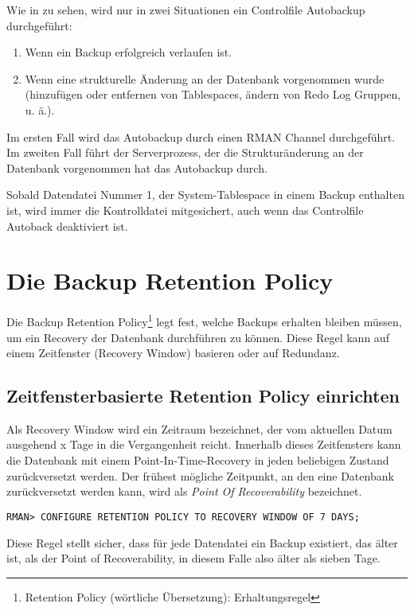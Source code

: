       Wie in  zu sehen, wird nur in zwei Situationen ein Controlfile Autobackup durchgef\"uhrt:
      \begin{enumerate}
        \item Wenn ein Backup erfolgreich verlaufen ist.
        \item Wenn eine strukturelle \"Anderung an der Datenbank vorgenommen wurde (hinzuf\"ugen oder entfernen von Tablespaces, \"andern von Redo Log Gruppen, u. \"a.).
      \end{enumerate}
      Im ersten Fall wird das Autobackup durch einen RMAN Channel durchgef\"uhrt. Im zweiten Fall f\"uhrt der Serverprozess, der die Struktur\"anderung an der Datenbank vorgenommen hat das Autobackup durch.
      \begin{merke}
        Sobald Datendatei Nummer 1, der System-Tablespace in einem Backup enthalten ist, wird immer die Kontrolldatei mitgesichert, auch wenn das Controlfile Autoback deaktiviert ist.
      \end{merke}

      \begin{literaturinternet}
        \item \cite[Control File and Server Parameter File Autobackups]{cfandspfileautobackups}
      \end{literaturinternet}
    \section{Die Backup Retention Policy}
      \label{backupretentionpolicy}
      Die Backup Retention Policy\footnote{Retention Policy (w\"ortliche \"Ubersetzung): Erhaltungsregel} legt fest, welche Backups erhalten bleiben m\"ussen, um ein Recovery der Datenbank durchf\"uhren zu k\"onnen. Diese Regel kann auf einem Zeitfenster (Recovery Window) basieren oder auf Redundanz.
      \subsection{Zeitfensterbasierte Retention Policy einrichten}
        Als Recovery Window wird ein Zeitraum bezeichnet, der vom aktuellen Datum ausgehend x Tage in die Vergangenheit reicht. Innerhalb dieses Zeitfensters kann die Datenbank mit einem Point-In-Time-Recovery in jeden beliebigen Zustand zur\"uckversetzt werden. Der fr\"uhest m\"ogliche Zeitpunkt, an den eine Datenbank zur\"uckversetzt werden kann, wird als \textit{Point Of Recoverability} bezeichnet.
        \begin{lstlisting}[caption={RECOVERY WINDOW setzen},label=admin1025,language=rman]
RMAN> CONFIGURE RETENTION POLICY TO RECOVERY WINDOW OF 7 DAYS;
        \end{lstlisting}
        Diese Regel stellt sicher, dass f\"ur jede Datendatei ein Backup existiert, das \"alter ist, als der Point of Recoverability, in diesem Falle also \"alter als sieben Tage.


